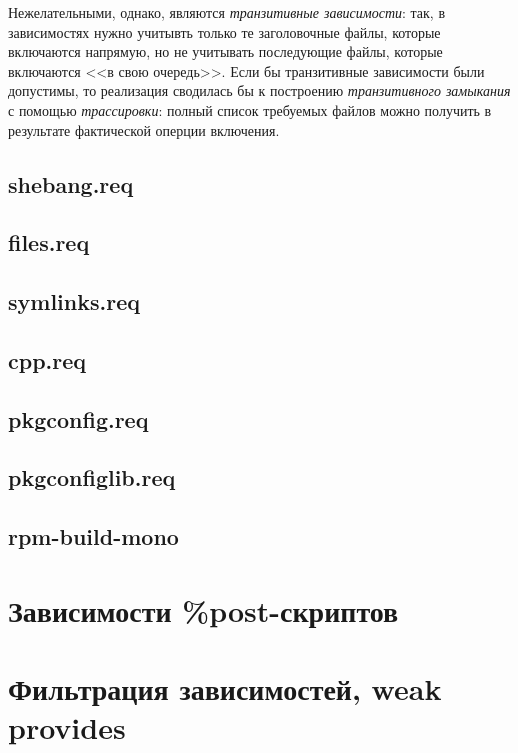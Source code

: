 \documentclass[russian,a4paper,12pt,titlepage]{article}
\begin{document}
Нежелательными, однако, являются \emph{транзитивные зависимости}: так, в зависимостях нужно учитывть
только те заголовочные файлы, которые включаются напрямую, но не учитывать последующие файлы, которые
включаются <<в свою очередь>>.  Если бы транзитивные зависимости были допустимы, то реализация сводилась бы
к построению \emph{транзитивного замыкания} с помощью \emph{трассировки}: полный список требуемых
файлов можно получить в результате фактической оперции включения.

\subsection{shebang.req}
\label{shebang-req}

\subsection{files.req}
\label{files-req}

\subsection{symlinks.req}
\label{symlinks-req}

\subsection{cpp.req}
\subsection{pkgconfig.req}
\subsection{pkgconfiglib.req}
\subsection{rpm-build-mono}
\label{rpm-build-mono}

\section{Зависимости \%post-скриптов}

\label{post-script-deps}

\section{Фильтрация зависимостей, weak provides}
\label{filter-deps}
\end{document}
